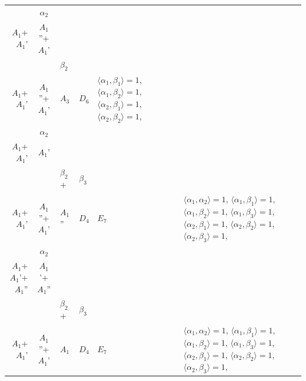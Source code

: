 \documentclass[12pt]{report}
\begin{document}
\begin{appendix}
{\begin{longtable}{rcl p{1cm}p{1cm}p{3cm} }
\\
\begin{tabular}{cc}$\alpha_1$+ & $\alpha_2$\\\tiny{ $A_1$+$A_1$' } & \tiny{ $A_1$''+$A_1$' }\end{tabular} &\begin{tabular}{c} = \\~ \end{tabular} & \begin{tabular}{cc}$\beta_1$+ & $\beta_2$\\\tiny{ $A_1$+$A_1$' } & \tiny{ $A_1$''+$A_1$' }\end{tabular} & $A_3$ & $D_6$ &  $\langle\alpha_1, \beta_1\rangle=1$, $\langle\alpha_1, \beta_2\rangle=1$, $\langle\alpha_2, \beta_1\rangle=1$, $\langle\alpha_2, \beta_2\rangle=1$, 
\\
\begin{tabular}{cc}$\alpha_1$+ & $\alpha_2$\\\tiny{ $A_1$+$A_1$' } & \tiny{ $A_1$' }\end{tabular} &\begin{tabular}{c} = \\~ \end{tabular} & \begin{tabular}{ccc}$\beta_1$+ & $\beta_2$+ & $\beta_3$\\\tiny{ $A_1$+$A_1$' } & \tiny{ $A_1$''+$A_1$' } & \tiny{ $A_1$'' }\end{tabular} & $D_4$ & $E_7$ & $\langle\alpha_1, \alpha_2\rangle=1$,  $\langle\alpha_1, \beta_1\rangle=1$, $\langle\alpha_1, \beta_2\rangle=1$, $\langle\alpha_1, \beta_3\rangle=1$, $\langle\alpha_2, \beta_1\rangle=1$, $\langle\alpha_2, \beta_2\rangle=1$, $\langle\alpha_2, \beta_3\rangle=1$, 
\\
\begin{tabular}{cc}$\alpha_1$+ & $\alpha_2$\\\tiny{ $A_1$+$A_1$'+$A_1$'' } & \tiny{ $A_1$'+$A_1$'' }\end{tabular} &\begin{tabular}{c} = \\~ \end{tabular} & \begin{tabular}{ccc}$\beta_1$+ & $\beta_2$+ & $\beta_3$\\\tiny{ $A_1$+$A_1$' } & \tiny{ $A_1$''+$A_1$' } & \tiny{ $A_1$ }\end{tabular} & $D_4$ & $E_7$ & $\langle\alpha_1, \alpha_2\rangle=1$,  $\langle\alpha_1, \beta_1\rangle=1$, $\langle\alpha_1, \beta_2\rangle=1$, $\langle\alpha_1, \beta_3\rangle=1$, $\langle\alpha_2, \beta_1\rangle=1$, $\langle\alpha_2, \beta_2\rangle=1$, $\langle\alpha_2, \beta_3\rangle=1$, 

\end{longtable}}
\end{appendix}
\end{document}
